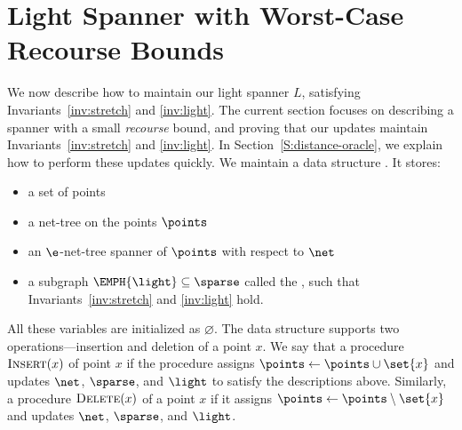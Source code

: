 \section{Light Spanner with Worst-Case Recourse Bounds}
\label{S:recourse}
%
We now describe how to maintain our light spanner $L$, satisfying Invariants~\ref{inv:stretch} and \ref{inv:light}. The current section focuses on describing a spanner with a small \emph{recourse} bound, and proving that our updates maintain Invariants~\ref{inv:stretch} and \ref{inv:light}. 
In Section~\ref{S:distance-oracle}, we explain how to perform these updates quickly. 
We maintain a data structure \EMPH{\DS}. It stores:
%
\begin{itemize}
    \item a set of points \EMPH{$\points$}
    \item a net-tree \EMPH{$\net$} on the points $\points$
    \item an $\e$-net-tree spanner \EMPH{$\sparse$} of $\points$ with respect to $\net$ 
    \item a subgraph $\EMPH{\light} \subseteq \sparse$ called the , such that Invariants~\ref{inv:stretch} and \ref{inv:light} hold.
\end{itemize}
%
All these variables are initialized as $\varnothing$. The data structure supports two operations---insertion and deletion of a point $x$. We say that a procedure $\textsc{Insert}(x)$  of point $x$ if the procedure assigns $\points \gets \points \cup \set{x}$ and updates $\net$, $\sparse$, and $\light$ to satisfy the descriptions above. Similarly, a procedure $\textsc{Delete}(x)$  of a point $x$  if it assigns $\points \gets \points \setminus \set{x}$ and updates $\net$, $\sparse$, and $\light$.
%
